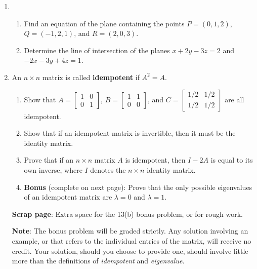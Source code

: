 \documentclass[12pt]{article}
\newcommand{\points}[1]{\marginpar{\hspace{24pt}[#1]}}
\newcommand{\bbm}{\begin{bmatrix}}
\newcommand{\ebm}{\end{bmatrix}}
\begin{document}
\begin{enumerate}
\newpage

\item 
\begin{enumerate}
 \item Find an equation of the plane containing the points  $P=(0,1,2)$, $Q=(-1,2,1)$, and $R=(2,0,3)$. \points{4}

\vspace{4in}

 \item Determine the line of intersection of the planes $x+2y-3z=2$ and $-2x-3y+4z=1$. \points{4}
\end{enumerate}


\newpage


 \item An $n\times n$ matrix is called \textbf{idempotent} if $A^2=A$.
\begin{enumerate}
 \item Show that $A=\bbm 1&0\\0&1\ebm$, $B= \bbm 1&1\\0&0\ebm$, and $C = \bbm 1/2&1/2\\1/2&1/2\ebm$ are all idempotent. \points{3}

\vspace{3in}

 \item Show that if an idempotent matrix is invertible, then it must be the identity matrix. \points{3}

\vspace{2in}

 \item Prove that if an $n\times n$ matrix $A$ is idempotent, then $I-2A$ is equal to its own inverse, where $I$ denotes the $n\times n$ identity matrix. \points{4}

\vspace*{\fill}

 \item \textbf{Bonus} (complete on next page): Prove that the only possible eigenvalues of an idempotent matrix are $\lambda = 0$ and $\lambda = 1$.\points{5}

\end{enumerate}



\newpage

\noindent\textbf{Scrap page}: Extra space for the 13(b) bonus problem, or for rough work.

\bigskip

\noindent\textbf{Note}: The bonus problem will be graded strictly. Any solution involving an example, or that refers to the individual entries of the matrix, will receive no credit. Your solution, should you choose to provide one, should involve little more than the definitions of \textit{idempotent} and \textit{eigenvalue}.


\end{enumerate}
\end{document}
